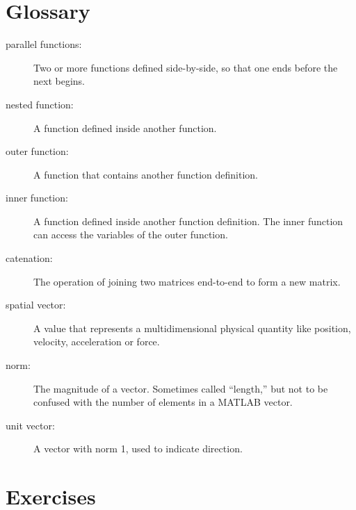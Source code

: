 \documentclass{book}
\begin{document}
\section{Glossary}

\begin{description}

\item[parallel functions:] Two or more functions defined side-by-side,
so that one ends before the next begins.

\item[nested function:] A function defined inside another function.

\item[outer function:] A function that contains another function
definition.

\item[inner function:] A function defined inside another function
definition.  The inner function can access the variables of the
outer function.

\item[catenation:] The operation of joining two matrices end-to-end to
form a new matrix.

\item[spatial vector:] A value that represents a
multidimensional physical quantity like position, velocity,
acceleration or force.

\item[norm:] The magnitude of a vector.  Sometimes called ``length,''
but not to be confused with the number of elements in a MATLAB
vector.

\item[unit vector:] A vector with norm 1, used to indicate
direction.


\end{description}

\section{Exercises}
\end{document}
